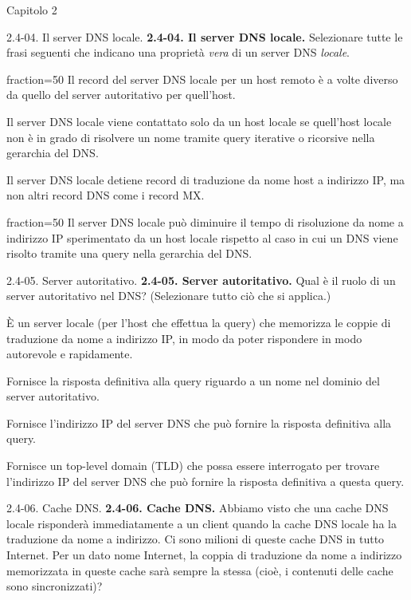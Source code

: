 \documentclass[a4paper]{article}
\begin{document}
\begin{quiz}{Capitolo 2}
\begin{multi}[points=1,shuffle,multiple]{2.4-04. Il server DNS locale.}
\textbf{2.4-04. Il server DNS locale.} 
Selezionare tutte le frasi seguenti che indicano una proprietà \emph{vera} di un server DNS \emph{locale}.
\item[fraction=50] Il record del server DNS locale per un host remoto è a volte diverso da quello del server autoritativo per quell'host.
\item Il server DNS locale viene contattato solo da un host locale se quell'host locale non è in grado di risolvere un nome tramite query iterative o ricorsive nella gerarchia del DNS.
\item Il server DNS locale detiene record di traduzione da nome host a indirizzo IP, ma non altri record DNS come i record MX.
\item[fraction=50] Il server DNS locale può diminuire il tempo di risoluzione da nome a indirizzo IP sperimentato da un host locale rispetto al caso in cui un DNS viene risolto tramite una query nella gerarchia del DNS.
\end{multi}


\begin{multi}[points=1,shuffle,multiple]{2.4-05. Server autoritativo.}
\textbf{2.4-05. Server autoritativo.} 
Qual è il ruolo di un server autoritativo nel DNS? (Selezionare tutto ciò che si applica.)
\item È un server locale (per l'host che effettua la query) che memorizza le coppie di traduzione da nome a indirizzo IP, in modo da poter rispondere in modo autorevole e rapidamente.
\item* Fornisce la risposta definitiva alla query riguardo a un nome nel dominio del server autoritativo.
\item Fornisce l'indirizzo IP del server DNS che può fornire la risposta definitiva alla query.
\item Fornisce un top-level domain (TLD) che possa essere interrogato per trovare l'indirizzo IP del server DNS che può fornire la risposta definitiva a questa query.
\end{multi}

\begin{multi}[points=1,shuffle]{2.4-06. Cache DNS.}
\textbf{2.4-06. Cache DNS.}
Abbiamo visto che una cache DNS locale risponderà immediatamente a un client quando la cache DNS locale ha la traduzione da nome a indirizzo. Ci sono milioni di queste cache DNS in tutto Internet. Per un dato nome Internet, la coppia di traduzione da nome a indirizzo memorizzata in queste cache sarà sempre la stessa (cioè, i contenuti delle cache sono sincronizzati)?


\end{multi}
\end{quiz}
\end{document}
